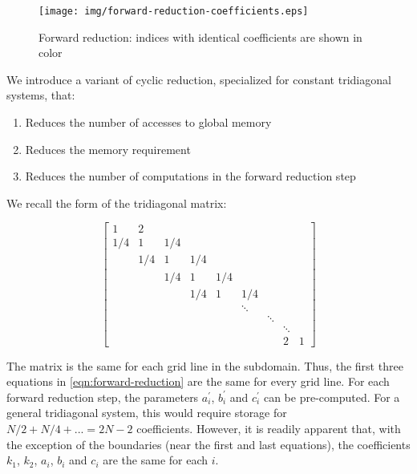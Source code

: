 \documentclass{article}
\begin{document}
        \begin{figure}[h]
        \begin{center}
        \texttt{[image: img/forward-reduction-coefficients.eps]}
        \end{center}
        \caption{Forward reduction: indices with identical coefficients are shown in color}
        \label{fig:forward-reduction-coefficients}
        \end{figure}

        We introduce a variant of cyclic reduction,
        specialized for constant tridiagonal systems, that:

        \begin{enumerate}
        \item Reduces the number of accesses to global memory
        \item Reduces the memory requirement
        \item Reduces the number of computations in the forward reduction step
        \end{enumerate}

        We recall the form of the tridiagonal matrix:

        \[
        \begin{bmatrix}
            1&2\\
            1/4&1&1/4\\
            &1/4&1&1/4\\
            &&1/4&1&1/4\\
            &&&1/4&1&1/4\\
            &&&&&\ddots\\
            &&&&&&\ddots\\
            &&&&&&&\ddots\\
            &&&&&&&2&1
         \end{bmatrix}
         \]

        The matrix is the same for each grid line in the subdomain.
        Thus,
        the first three equations in \ref{eqn:forward-reduction}
        are the same for every grid line.
        For each forward reduction step,
        the parameters $a^{\prime}_i$, $b^{\prime}_i$ and $c^{\prime}_i$
        can be pre-computed.
        For a general tridiagonal system, this would require storage for
        $N/2 + N/4 + ... = 2N-2$ coefficients.
        However, it is readily apparent that,
        with the exception of the boundaries (near the first and last equations),
        the coefficients $k_1$, $k_2$,
        $a_i$, $b_i$ and $c_i$ are the same for each $i$.
\end{document}
